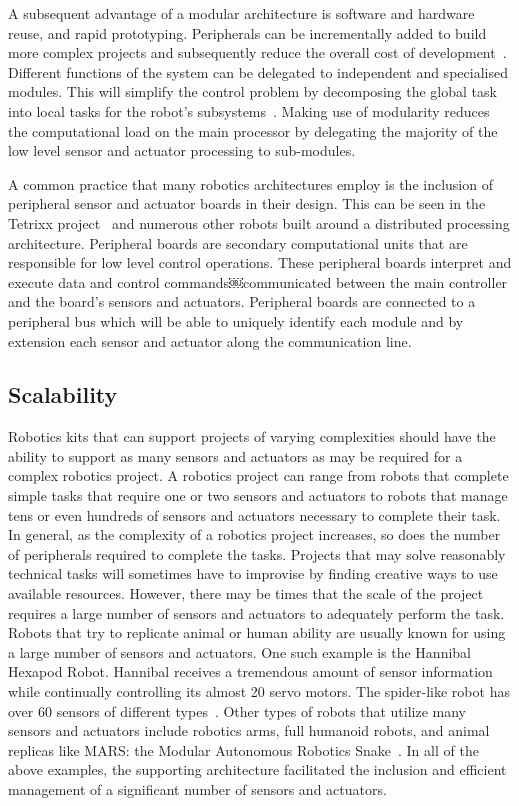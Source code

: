 A subsequent advantage of a modular architecture is software and hardware reuse, and rapid prototyping. Peripherals can be incrementally added to build more complex projects and subsequently reduce the overall cost of development~\parencite{modcom}. Different functions of the system can be delegated to independent and specialised modules. This will simplify the control problem by decomposing the global task into local tasks for the robot's subsystems~\parencite{rdk}. Making use of modularity reduces the computational load on the main processor by delegating the majority of the low level sensor and actuator processing to sub-modules. 

A common practice that many robotics architectures employ is the inclusion of peripheral sensor and actuator boards in their design. This can be seen in the Tetrixx project~\parencite{tetrixx} and numerous other robots built around a distributed processing architecture. Peripheral boards are secondary computational units that are responsible for low level control operations. These peripheral boards interpret and execute data and control commands￼communicated between the main controller and the board's sensors and actuators. Peripheral boards are connected to a peripheral bus which will be able to uniquely identify each module and by extension each sensor and actuator along the communication line. 

 

\subsection{Scalability} %
\label{sub:scalability}
Robotics kits that can support projects of varying complexities should have the ability to support as many sensors and actuators as may be required for a complex robotics project. A robotics project can range from robots that complete simple tasks that require one or two sensors and actuators to robots that manage tens or even hundreds of sensors and actuators necessary to complete their task. In general, as the complexity of a robotics project increases, so does the number of peripherals required to complete the tasks. Projects that may solve reasonably technical tasks will sometimes have to improvise by finding creative ways to use available resources. However, there may be times that the scale of the project requires a large number of sensors and actuators to adequately perform the task. Robots that try to replicate animal or human ability are usually known for using a large number of sensors and actuators. One such example is the Hannibal Hexapod Robot. Hannibal receives a tremendous amount of sensor  information while continually controlling its almost 20 servo motors.  The spider-like robot has over 60 sensors of different types~\parencite{hannibal}. Other types of robots that utilize many sensors and actuators include robotics arms, full humanoid robots, and animal replicas like MARS: the Modular  Autonomous Robotics Snake~\parencite{mars}. In all of the above examples, the supporting architecture facilitated the inclusion and efficient management of a significant number of sensors and actuators.

